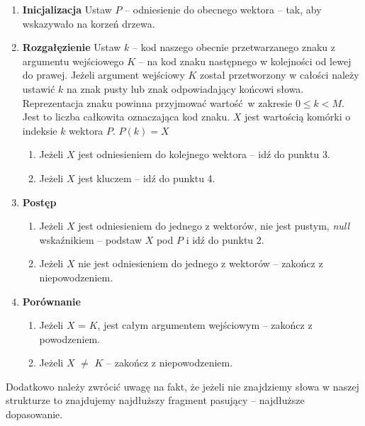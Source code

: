 	\begin{enumerate}
		\item \textbf{Inicjalizacja} \newline
		Ustaw $P$ -- odniesienie do obecnego wektora -- tak, aby wskazywało na korzeń drzewa.
		\item \textbf{Rozgałęzienie} \newline
		Ustaw $k$ -- kod naszego obecnie przetwarzanego znaku z argumentu wejściowego $K$ -- na kod znaku następnego w kolejności od lewej do prawej. \newline
		Jeżeli argument wejściowy $K$ został przetworzony w całości należy ustawić $k$ na znak pusty lub znak odpowiadający końcowi słowa. \newline
		Reprezentacja znaku powinna przyjmować wartość w zakresie $0\leq k < M$. Jest to liczba całkowita oznaczająca kod znaku. \newline
		$X$ jest wartością komórki o indeksie $k$ wektora $P$. $P(k) = X$
		\begin{enumerate}
			\item Jeżeli $X$ jest odniesieniem do kolejnego wektora -- idź do punktu 3.
			\item Jeżeli $X$ jest kluczem -- idź do punktu 4.
		\end{enumerate}
		\item \textbf{Postęp} 
		\begin{enumerate} 
			\item Jeżeli $X$ jest odniesieniem do jednego z wektorów, nie jest pustym, \emph{null} wskaźnikiem -- podstaw $X$ pod $P$ i idź do punktu 2.
			\item Jeżeli $X$ nie jest odniesieniem do jednego z wektorów -- zakończ z niepowodzeniem.
		\end{enumerate}
		\item \textbf{Porównanie} 
		\begin{enumerate}
			\item Jeżeli $X$ = $K$, jest całym argumentem wejściowym -- zakończ z powodzeniem.
			\item Jeżeli $X$ $\neq$ $K$ -- zakończ z niepowodzeniem. \newline
		\end{enumerate}			
	\end{enumerate}
	
	Dodatkowo należy zwrócić uwagę na fakt, że jeżeli nie znajdziemy słowa w naszej strukturze to znajdujemy najdłuższy fragment pasujący -- najdłuższe dopasowanie.
	
